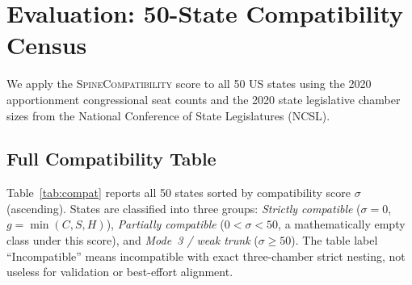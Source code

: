 \section{Evaluation: 50-State Compatibility Census}
\label{sec:evaluation}

We apply the \textsc{SpineCompatibility} score to all 50 US states using the
2020 apportionment congressional seat counts and the 2020 state legislative
chamber sizes from the National Conference of State Legislatures (NCSL).

\subsection{Full Compatibility Table}

Table~\ref{tab:compat} reports all 50 states sorted by compatibility score
$\sigma$ (ascending).  States are classified into three groups:
\emph{Strictly compatible} ($\sigma = 0$, $g = \min(C,S,H)$),
\emph{Partially compatible} ($0 < \sigma < 50$, a mathematically empty class
under this score), and \emph{Mode~3 / weak trunk} ($\sigma \geq 50$).  The
table label ``Incompatible'' means incompatible with exact three-chamber
strict nesting, not useless for validation or best-effort alignment.

